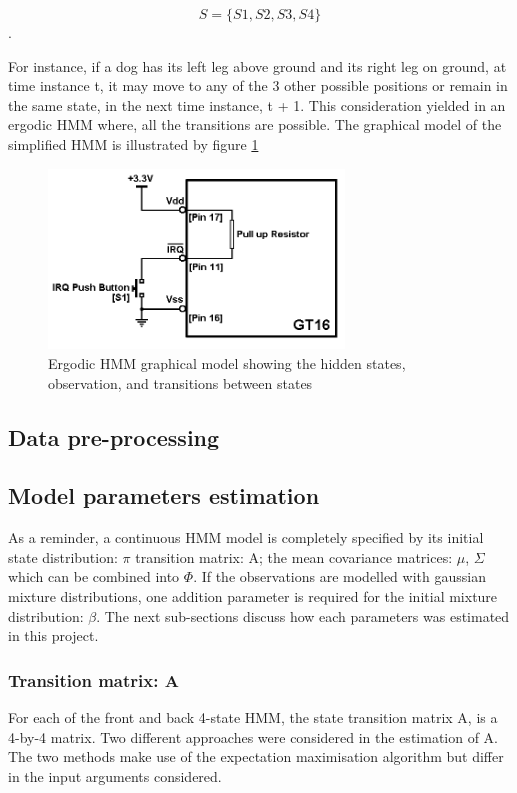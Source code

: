 \[S = \{S1, S2, S3, S4\}\].

For instance, if a dog has its left leg above ground and its right leg on ground, at time instance t, it may move to any of the 3 other possible positions or remain in the same state, in the next time instance, t + 1. 
This consideration yielded in an ergodic HMM where, all the transitions are possible. The graphical model of the simplified HMM is illustrated by figure \ref{fig:model}

\begin{figure}[ht]
	\centering
	\includegraphics[width=0.7\textwidth]{model.png}
	\caption{Ergodic HMM graphical model showing the hidden states, observation, and transitions between states}
	\label{fig:model}
\end{figure}

\subsection{Data pre-processing}

\subsection{Model parameters estimation}
As a reminder, a continuous HMM model is completely specified by its initial state distribution: \(\pi\) transition matrix: A; the mean covariance matrices: \(\mu\), \(\Sigma\) which can be combined into \(\Phi\). If the observations are modelled with gaussian mixture distributions, one addition parameter is required for the initial mixture distribution: \(\beta\). The next sub-sections discuss how each parameters was estimated in this project.

\subsubsection{Transition matrix: A}
For each of the front and back 4-state HMM, the state transition matrix A, is a 4-by-4 matrix. Two different approaches were considered in the estimation of A. The two methods make use of the expectation maximisation algorithm %
but differ in the input arguments considered.

